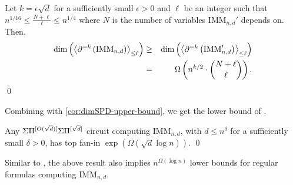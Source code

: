 \begin{theorem}Let $k = \epsilon\sqrt{d}$ for a sufficiently small $\epsilon > 0$ and $\ell$ be an integer such that $n^{1/16} \leq \frac{N + \ell}{\ell} \leq n^{1/4}$ where $N$ is the number of variables $\mathrm{IMM}_{n,d}'$ depends on. 
Then, 
\begin{eqnarray*}
\dim\left(\left\langle\partial^{=k}\left(\mathrm{IMM}_{n,d}\right)\right\rangle_{\leq \ell}\right) &\geq& \dim\left(\left\langle\partial^{=k}\left(\mathrm{IMM}'_{n,d}\right)\right\rangle_{\leq \ell}\right) \\
& =& \Omega\left(n^{k/2} \cdot \binom{N + \ell}{\ell}\right).
\end{eqnarray*}
\qed
\end{theorem}

Combining with \autoref{cor:dimSPD-upper-bound}, we get the lower bound of \cite{FLMS13}. 

\begin{theorem}
Any $\Sigma\Pi^{[O(\sqrt{d})]}\Sigma\Pi^{[\sqrt{d}]}$ circuit computing $\mathrm{IMM}_{n,d}$, with $d \leq n^{\delta}$ for a sufficiently small $\delta > 0$, has top fan-in $\exp(\Omega(\sqrt{d}\log n))$. \qed
\end{theorem}

Similar to \cite{KSS13}, the above result also implies $n^{\Omega(\log n)}$ lower bounds for regular formulas computing $\mathrm{IMM}_{n,d}$. 



